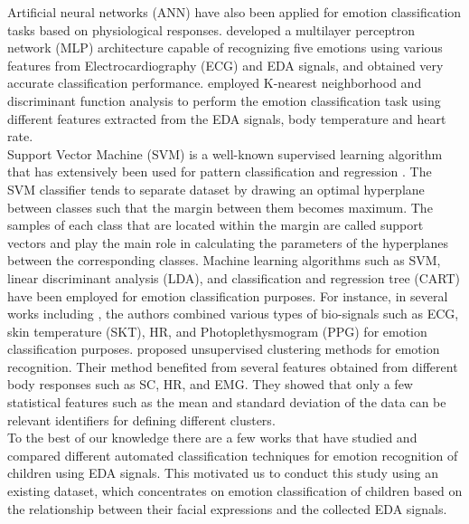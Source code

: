 Artificial neural networks (ANN) have also been applied for emotion classification 
tasks based on physiological responses. \cite{MultPercep2007} developed a multilayer perceptron 
network (MLP) architecture capable of recognizing five emotions using various features 
from Electrocardiography (ECG) and EDA signals, and obtained very accurate classification 
performance. \cite{EmotionRecog2004} employed K-nearest neighborhood and discriminant 
function analysis to perform the emotion classification task using different features 
extracted from the EDA signals, body temperature and heart rate.\\

Support Vector Machine (SVM) is a well-known supervised learning algorithm that has 
extensively been used for pattern classification and regression \cite{SupportVector1995}. The SVM classifier tends to separate dataset by drawing an optimal hyperplane 
between classes such that the margin between them becomes maximum. The samples of 
each class that are located within the margin are called support vectors and play the 
main role in calculating the parameters of the hyperplanes between the corresponding 
classes. Machine learning algorithms such as SVM, linear discriminant analysis (LDA), 
and classification and regression tree (CART) have been employed for emotion 
classification purposes. For instance, in several works including \cite{Taxonomy2011, EmotionClassifi2014}, the authors combined various types of bio-signals such as ECG, 
skin temperature (SKT), HR, and Photoplethysmogram (PPG) for  emotion classification 
purposes. \cite{FeatureSelection2006} proposed unsupervised clustering methods for emotion 
recognition. Their method benefited from several features obtained from different 
body responses such as SC, HR, and EMG. They showed that only a few statistical 
features such as the mean and standard deviation of the data can be relevant identifiers 
for defining different clusters. \\

To the best of our knowledge there are a few works \cite{EmotionResp2013, SlowEcho2009} that have studied and compared different automated 
classification techniques for emotion recognition of children using EDA signals. 
This motivated us to conduct this study using an existing dataset, which concentrates 
on emotion classification of children based on the relationship between their facial 
expressions and the collected EDA signals.







